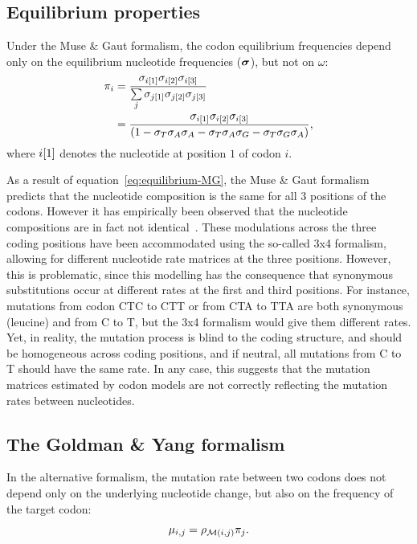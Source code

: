 \subsection{Equilibrium properties}
\label{subsec:equilibrium-properties}

Under the Muse \& Gaut formalism, the codon equilibrium frequencies depend only on the equilibrium nucleotide frequencies ($\bm{\sigma}$), but not on $\omega$:
\begin{align}
    \pi_{{i}} & = \dfrac{\sigma_{{i}[1]}\sigma_{{i}[2]}\sigma_{{i}[3]}}{\sum\limits_{{j}}\sigma_{{j}[1]}\sigma_{{j}[2]}\sigma_{{j}[3]} } \\
    & = \dfrac{\sigma_{{i}[1]}\sigma_{{i}[2]}\sigma_{{i}[3]}}{(1 - \sigma_{T}\sigma_{A}\sigma_{A} - \sigma_{T}\sigma_{A}\sigma_{G} - \sigma_{T}\sigma_{G}\sigma_{A} )}, \label{eq:equilibrium-MG}
\end{align}
where ${i}[1]$ denotes the nucleotide at position $1$ of codon $i$.

As a result of equation~\ref{eq:equilibrium-MG}, the Muse \& Gaut formalism predicts that the nucleotide composition is the same for all $3$ positions of the codons.
However it has empirically been observed that the nucleotide compositions are in fact not identical~\citep{Singer2000}.
These modulations across the three coding positions have been accommodated using the so-called 3x4 formalism, allowing for different nucleotide rate matrices at the three positions.
However, this is problematic, since this modelling has the consequence that synonymous substitutions occur at different rates at the first and third positions.
For instance, mutations from codon CTC to CTT or from CTA to TTA are both synonymous (leucine) and from C to T, but the 3x4 formalism would give them different rates.
Yet, in reality, the mutation process is blind to the coding structure, and should be homogeneous across coding positions, and if neutral, all mutations from C to T should have the same rate.
In any case, this suggests that the mutation matrices estimated by codon models are not correctly reflecting the mutation rates between nucleotides.

\subsection{The Goldman \& Yang formalism}
\label{subsec:GY-formalism}

In the alternative \citet{Goldman1994} formalism, the mutation rate between two codons does not depend only on the underlying nucleotide change, but also on the frequency of the target codon:
\begin{equation}
    \mu_{{i}, {j}} = \rho_{\mathcal{M}({i}, {j})} \pi_{{j}}.
\end{equation}

